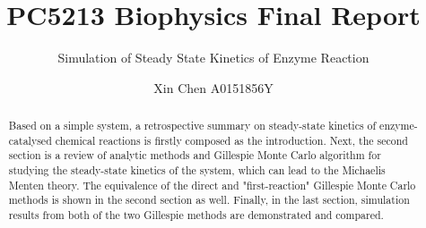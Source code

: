 \documentclass[a4paper, 10pt]{scrartcl}
\title{PC5213 Biophysics Final Report}
\subtitle{Simulation of Steady State Kinetics of Enzyme Reaction}
\author[*]{Xin Chen A0151856Y}
\date{\vspace{-7ex}}
\begin{document}
  \maketitle 
  \begin{abstract}
  Based on a simple system, a retrospective summary on steady-state kinetics of enzyme-catalysed chemical reactions is firstly composed as the introduction. Next, the second section is a review of analytic methods and Gillespie Monte Carlo algorithm for studying the steady-state kinetics of the system, which can lead to the Michaelis Menten theory. The equivalence of the direct and "first-reaction" Gillespie Monte Carlo methods is shown in the second section as well. Finally, in the last section, simulation results from both of the two Gillespie methods are demonstrated and compared.

  \end{abstract}

  
  
\end{document}
